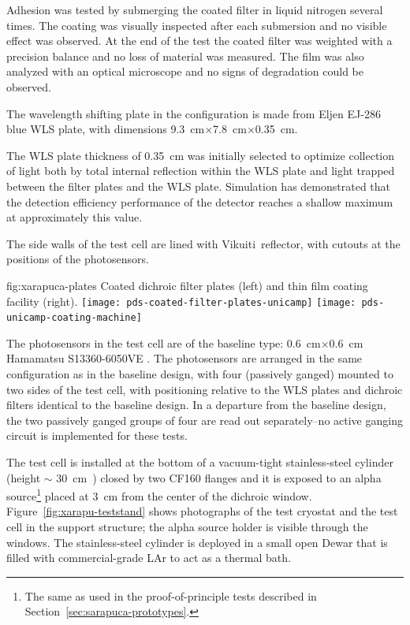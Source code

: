 Adhesion was tested by submerging the coated filter in liquid nitrogen several times. The coating was visually inspected after each submersion and no visible effect was observed. At the end of the test the coated filter was weighted with a precision balance and no loss of material was measured. The film was also analyzed with an optical microscope and no signs of degradation could be observed. 

The wavelength shifting plate in the  configuration is made from Eljen EJ-286 blue WLS plate, with dimensions \SI{9.3}{cm}$\times$\SI{7.8}{cm}$\times$\SI{0.35}{cm}.  

The WLS plate thickness of \SI{0.35}{cm} was initially selected to optimize collection of light both by total internal reflection within the WLS plate and light trapped between the filter plates and the WLS plate.  Simulation has demonstrated that the detection efficiency performance of the detector reaches a shallow maximum at approximately this value.

The side walls of the test cell are lined with Vikuiti\texttrademark\ reflector, with cutouts at the positions of the photosensors.

\begin{dunefigure}{fig:xarapuca-plates}
{Coated dichroic filter plates (left) and  thin film coating facility (right).} 
	\texttt{[image: pds-coated-filter-plates-unicamp]}\quad
	\texttt{[image: pds-unicamp-coating-machine]}
\end{dunefigure}

The photosensors in the test cell are of the baseline type:  \SI{0.6}{cm}$\times$\SI{0.6}{cm} Hamamatsu S13360-6050VE .  The photosensors are arranged in the same configuration as in the baseline design, with four  (passively ganged) mounted to two sides of the test cell, with positioning relative to the WLS plates and dichroic filters identical to the baseline design.  In a departure from the baseline design, the two passively ganged groups of four  are read out separately--no active ganging circuit is implemented for these tests. 

The test cell is installed at the bottom of a  vacuum-tight  stainless-steel cylinder (height $\sim$ \SI{30}{cm)} closed by two CF160 flanges and it is exposed to an alpha source\footnote{The same as used in the  proof-of-principle tests described in Section~\ref{sec:sarapuca-prototypes}.} 
placed at \SI{3}{cm} from the center of the dichroic window. Figure~\ref{fig:xarapu-teststand} shows photographs of the test cryostat and the test cell in the support structure; the alpha source holder is visible through the windows.
The stainless-steel cylinder  is deployed in a small open Dewar that is filled with commercial-grade LAr to act as a thermal bath.

